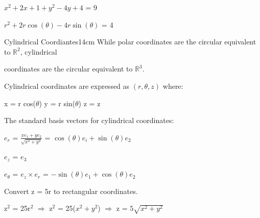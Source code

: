     \begin{tbox}
        $x^2 + 2x + 1 + y^2 - 4y + 4$ = 9

        $r^2 + 2r\cos(\theta) - 4r\sin(\theta)$ = 4
    \end{tbox}

    \vspace{0.5cm}



    \begin{definition}{Cylindrical Coordiantes}{14cm}
        While polar coordinates are the circular equivalent to $\mathbb{R}^2$,
        cylindrical
        
        coordinates are the circular equivalent to $\mathbb{R}^3$.
        
        {\color{lblue} Cylindrical coordinates} are expressed as
        $(r,\theta,z)$ where:

        \hspace{0.5cm}
        x = r cos($\theta$)
        \hspace{1cm}
        y = r sin($\theta$)
        \hspace{1cm}
        z = z

        \vspace{0.3cm}

        The standard basis vectors for cylindrical coordinates:

        \hspace{0.5cm}
        $e_r$ = $\frac{xe_1 + ye_2}{\sqrt{x^2+y^2}}$
        = $\cos(\theta)e_i + \sin(\theta)e_2$

        \hspace{0.5cm}
        $e_z$ = $e_3$

        \hspace{0.5cm}
        $e_{\theta}$
        = $e_z \times e_r$
        = $-\sin(\theta)e_1 + \cos(\theta)e_2$
    \end{definition}

    \vspace{0.5cm}



    \begin{example}
        Convert z = 5r to rectangular coordinates.
    \end{example}

    \begin{tbox}
        z$^2$ = 25r$^2$
        \hspace{1cm}
        $\Rightarrow$
        \hspace{1cm}
        z$^2$ = 25($x^2+y^2$)
        \hspace{1cm}
        $\Rightarrow$
        \hspace{1cm}
        z = $5\sqrt{x^2+y^2}$
    \end{tbox}

